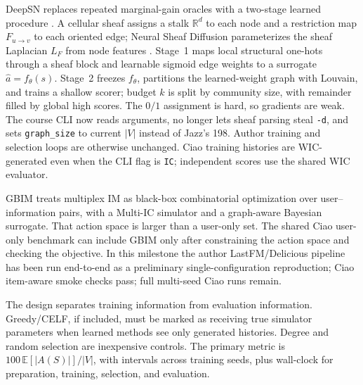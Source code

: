 \documentclass[10pt,twocolumn]{article}
\begin{document}
DeepSN replaces repeated marginal-gain oracles with a two-stage learned procedure \cite{deepsn}. A cellular sheaf assigns a stalk $\mathbb{R}^{d}$ to each node and a restriction map $F_{u\to v}$ to each oriented edge; Neural Sheaf Diffusion parameterizes the sheaf Laplacian $L_F$ from node features \cite{hansen,bodnar}. Stage~1 maps local structural one-hots through a sheaf block and learnable sigmoid edge weights to a surrogate $\hat a=f_{\theta}(s)$. Stage~2 freezes $f_{\theta}$, partitions the learned-weight graph with Louvain, and trains a shallow scorer; budget $k$ is split by community size, with remainder filled by global high scores. The $0/1$ assignment is hard, so gradients are weak. The course CLI now reads arguments, no longer lets sheaf parsing steal \texttt{-d}, and sets \texttt{graph\_size} to current $|V|$ instead of Jazz's 198. Author training and selection loops are otherwise unchanged. Ciao training histories are WIC-generated even when the CLI flag is \texttt{IC}; independent scores use the shared WIC evaluator.

GBIM treats multiplex IM as black-box combinatorial optimization over user--information pairs, with a Multi-IC simulator and a graph-aware Bayesian surrogate. That action space is larger than a user-only set. The shared Ciao user-only benchmark can include GBIM only after constraining the action space and checking the objective. In this milestone the author LastFM/Delicious pipeline has been run end-to-end as a preliminary single-configuration reproduction; Ciao item-aware smoke checks pass; full multi-seed Ciao runs remain.

The design separates training information from evaluation information. Greedy/CELF, if included, must be marked as receiving true simulator parameters when learned methods see only generated histories. Degree and random selection are inexpensive controls. The primary metric is $100\,\mathbb{E}[|A(S)|]/|V|$, with intervals across training seeds, plus wall-clock for preparation, training, selection, and evaluation.
\end{document}
